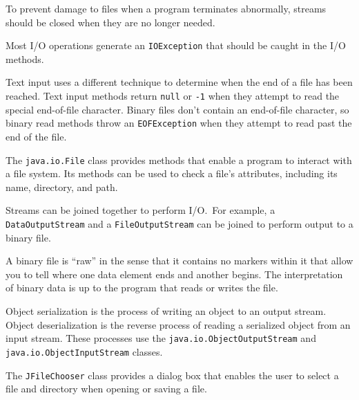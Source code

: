 \begin{SMBLlarge}
\item  To prevent damage to files when a program terminates
abnormally, streams should be closed when they are no longer
needed.

\item  Most I/O operations generate an {\tt IOException} that
should be caught in the I/O methods.

\item  Text input uses a different technique to determine
when the end of a file has been reached.  Text input methods return
{\tt null} or {\tt -1} when they attempt to read the special
end-of-file character.   Binary files don't contain an end-of-file
character, so binary read methods throw an {\tt EOFException} when they
attempt to read past the end of the file.

\item  The {\tt java.io.File} class provides methods that
enable a program to interact with a file system.  Its methods can be
used to check a file's attributes, including its name, directory,
and path.

\item  Streams can be joined together to perform
I/O.~For example, a {\tt DataOutputStream} and a {\tt FileOutputStream}
can be joined to perform output to a binary file.

\item  A binary file is ``raw'' in the sense that it contains
no markers within it that allow you to tell where one data element
ends and another begins.  The interpretation of binary data
is up to the program that reads or writes the file.

\item  Object serialization is the process of writing an
object to an output stream.  Object deserialization is the reverse
process of reading a serialized object from an input stream.   These
processes use the {\tt java.io.\-ObjectOutputStream} and
{\tt java.io.ObjectInputStream} classes.

\item  The {\tt JFileChooser} class provides a dialog box that
enables the user to select a file and directory when
opening or saving a file.
\end{SMBLlarge}

